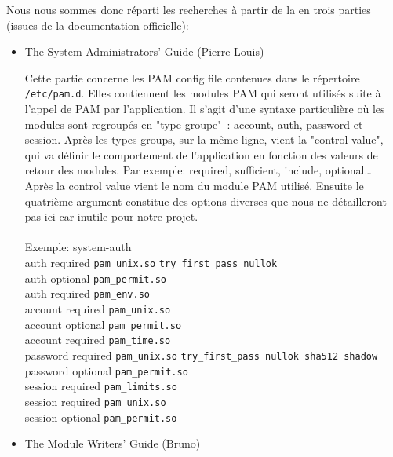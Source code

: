 \documentclass{article}
\begin{document}
  Nous nous sommes donc réparti les recherches à partir de la en trois parties
  (issues de la documentation officielle):
  \begin{itemize}
    \item{The System Administrators' Guide (Pierre-Louis)}

    \vspace{0.05cm}

Cette partie concerne les PAM config file contenues dans le répertoire
\verb|/etc/pam.d|. Elles contiennent les modules PAM qui seront utilisés suite à
l’appel de PAM par l’application. Il s’agit d’une syntaxe particulière où les
modules sont regroupés en "type groupe" : account, auth, password et session.
Après les types groups, sur la même ligne, vient la "control value", qui va
définir le comportement de l’application en fonction des valeurs de retour des
modules. Par exemple: required, sufficient, include, optional… Après la control
value vient le nom du module PAM utilisé. Ensuite le quatrième argument
constitue des options diverses que nous ne détailleront pas ici car inutile
pour notre projet.
\\ \\
    Exemple: system-auth \\

    auth      required  \texttt{pam\_unix.so}   \texttt{try\_first\_pass
    nullok} \\
    auth      optional  \texttt{pam\_permit.so} \\
    auth      required  \texttt{pam\_env.so} \\

    account   required  \texttt{pam\_unix.so} \\
    account   optional  \texttt{pam\_permit.so} \\
    account   required  \texttt{pam\_time.so} \\

    password  required  \texttt{pam\_unix.so}   \texttt{try\_first\_pass nullok
    sha512 shadow} \\
    password  optional  \texttt{pam\_permit.so} \\

    session   required  \texttt{pam\_limits.so} \\
    session   required  \texttt{pam\_unix.so} \\
    session   optional  \texttt{pam\_permit.so} \\

    \item{The Module Writers' Guide (Bruno)}


\end{itemize}
\end{document}
